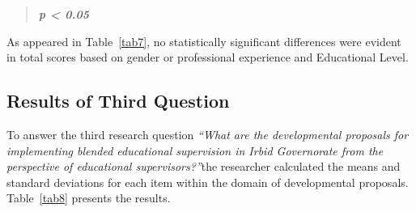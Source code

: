 \documentclass[10pt]{NSP1}
\begin{document}
\begin{quote}
\emph{\textbf{p \textless{} 0.05}}
\end{quote}

As appeared in Table~\ref{tab7}, no statistically significant differences were evident in total scores based on gender or professional experience and Educational Level.

\subsection{Results of Third Question}

To answer the third research question \emph{``What are the developmental proposals for implementing blended educational supervision in Irbid Governorate from the perspective of educational supervisors?''}the researcher calculated the means and standard deviations for each item within the domain of developmental proposals. Table~\ref{tab8} presents the results.
\end{document}
